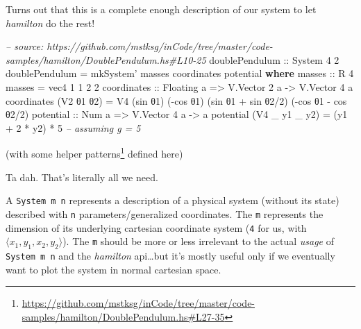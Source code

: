 \documentclass[]{article}
\newenvironment{Shaded}{}{}
\newcommand{\KeywordTok}[1]{\textcolor[rgb]{0.00,0.44,0.13}{\textbf{{#1}}}}
\newcommand{\DataTypeTok}[1]{\textcolor[rgb]{0.56,0.13,0.00}{{#1}}}
\newcommand{\DecValTok}[1]{\textcolor[rgb]{0.25,0.63,0.44}{{#1}}}
\newcommand{\CommentTok}[1]{\textcolor[rgb]{0.38,0.63,0.69}{\textit{{#1}}}}
\newcommand{\OtherTok}[1]{\textcolor[rgb]{0.00,0.44,0.13}{{#1}}}
\newcommand{\FunctionTok}[1]{\textcolor[rgb]{0.02,0.16,0.49}{{#1}}}
\newcommand{\NormalTok}[1]{{#1}}
\renewcommand{\href}[2]{#2\footnote{\url{#1}}}
\begin{document}
Turns out that this is a complete enough description of our system to let
\emph{hamilton} do the rest!

\begin{Shaded}
\begin{Highlighting}[]
\CommentTok{-- source: https://github.com/mstksg/inCode/tree/master/code-samples/hamilton/DoublePendulum.hs#L10-25}
\OtherTok{doublePendulum ::} \DataTypeTok{System} \DecValTok{4} \DecValTok{2}
\NormalTok{doublePendulum }\FunctionTok{=} \NormalTok{mkSystem' masses coordinates potential}
  \KeywordTok{where}
\OtherTok{    masses ::} \DataTypeTok{R} \DecValTok{4}
    \NormalTok{masses }\FunctionTok{=} \NormalTok{vec4 }\DecValTok{1} \DecValTok{1} \DecValTok{2} \DecValTok{2}
    \NormalTok{coordinates}
\OtherTok{        ::} \DataTypeTok{Floating} \NormalTok{a}
        \OtherTok{=>} \DataTypeTok{V.Vector} \DecValTok{2} \NormalTok{a}
        \OtherTok{->} \DataTypeTok{V.Vector} \DecValTok{4} \NormalTok{a}
    \NormalTok{coordinates (}\DataTypeTok{V2} \NormalTok{θ}\DecValTok{1} \NormalTok{θ}\DecValTok{2}\NormalTok{) }\FunctionTok{=} \DataTypeTok{V4} \NormalTok{(sin θ}\DecValTok{1}\NormalTok{)            (}\FunctionTok{-}\NormalTok{cos θ}\DecValTok{1}\NormalTok{)}
                                \NormalTok{(sin θ}\DecValTok{1} \FunctionTok{+} \NormalTok{sin θ}\DecValTok{2}\FunctionTok{/}\DecValTok{2}\NormalTok{) (}\FunctionTok{-}\NormalTok{cos θ}\DecValTok{1} \FunctionTok{-} \NormalTok{cos θ}\DecValTok{2}\FunctionTok{/}\DecValTok{2}\NormalTok{)}
    \NormalTok{potential}
\OtherTok{        ::} \DataTypeTok{Num} \NormalTok{a}
        \OtherTok{=>} \DataTypeTok{V.Vector} \DecValTok{4} \NormalTok{a}
        \OtherTok{->} \NormalTok{a}
    \NormalTok{potential (}\DataTypeTok{V4} \NormalTok{_ y1 _ y2) }\FunctionTok{=} \NormalTok{(y1 }\FunctionTok{+} \DecValTok{2} \FunctionTok{*} \NormalTok{y2) }\FunctionTok{*} \DecValTok{5}    \CommentTok{-- assuming g = 5}
\end{Highlighting}
\end{Shaded}

(with some
\href{https://github.com/mstksg/inCode/tree/master/code-samples/hamilton/DoublePendulum.hs\#L27-35}{helper
patterns} defined here)

Ta dah. That's literally all we need.

A \texttt{System\ m\ n} represents a description of a physical system (without
its state) described with \texttt{n} parameters/generalized coordinates. The
\texttt{m} represents the dimension of its underlying cartesian coordinate
system (\texttt{4} for us, with \(\langle x_1, y_1, x_2, y_2 \rangle\)). The
\texttt{m} should be more or less irrelevant to the actual \emph{usage} of
\texttt{System\ m\ n} and the \emph{hamilton} api\ldots{}but it's mostly useful
only if we eventually want to plot the system in normal cartesian space.
\end{document}
